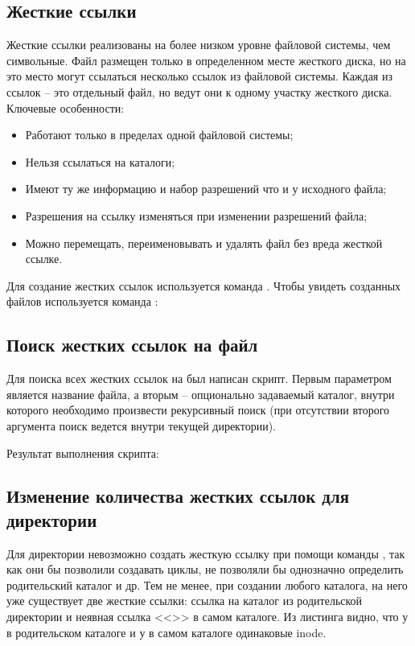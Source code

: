 \subsection{Жесткие ссылки}

Жесткие ссылки реализованы на более низком уровне файловой системы, чем символьные. Файл размещен только в определенном месте жесткого диска, но на это место могут ссылаться несколько ссылок из файловой системы. Каждая из ссылок -- это отдельный файл, но ведут они к одному участку жесткого диска. Ключевые особенности:
\begin{itemize}
	\item Работают только в пределах одной файловой системы;
	\item Нельзя ссылаться на каталоги;
	\item Имеют ту же информацию  и набор разрешений что и у исходного файла;
	\item Разрешения на ссылку изменяться при изменении разрешений файла;
	\item Можно перемещать, переименовывать и удалять файл без вреда жесткой ссылке.
\end{itemize}

Для создание жестких ссылок используется команда . Чтобы увидеть  созданных файлов используется команда :


\subsection{Поиск жестких ссылок на файл}

Для поиска всех жестких ссылок на был написан скрипт. Первым параметром является название файла, а вторым -- опционально задаваемый каталог, внутри которого необходимо произвести рекурсивный поиск (при отсутствии второго аргумента поиск ведется внутри текущей директории).


Результат выполнения скрипта:


\subsection{Изменение количества жестких ссылок для директории}

Для директории невозможно создать жесткую ссылку при помощи команды , так как они бы позволили создавать циклы, не позволяли бы однозначно определить родительский каталог и др. Тем не менее, при создании любого каталога, на него уже существует две жесткие ссылки: ссылка на каталог из родительской директории и неявная ссылка <<>> в самом каталоге. Из листинга видно, что у  в родительском каталоге и у  в самом каталоге одинаковые inode.


